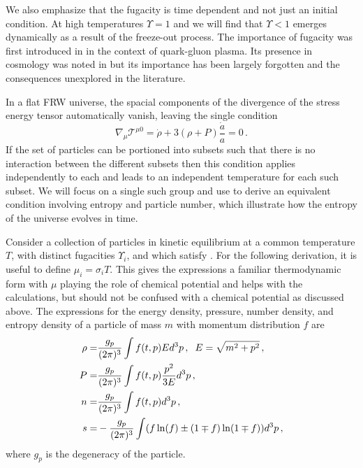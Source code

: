 We also emphasize that the fugacity is time dependent and not just an initial condition.  At high temperatures $\Upsilon=1$ and we will find that $\Upsilon<1$ emerges dynamically as a result of the freeze-out process. The importance of fugacity was first introduced in \cite{Rafelski:1982pu} in the context of quark-gluon plasma.  Its presence in cosmology was noted in  \cite{Bernstein:1985th,Dolgov:1992wf} but its importance has been largely forgotten and the consequences unexplored in the literature.  

In a flat FRW universe, the spacial components of the divergence of the stress energy tensor automatically vanish, leaving the single condition
\begin{equation}\label{stress_energy_eq}
\nabla_\mu \mathcal{T}^{\mu 0}=\dot{\rho}+3\left(\rho+P\right)\frac{\dot{a}}{a}=0\,.
\end{equation}
If the set of particles can be portioned into subsets such that there is no interaction between the different subsets then this condition applies independently to each and leads to an independent temperature for each such subset.  We will focus on a single such group and use   to derive an equivalent condition involving entropy and particle number, which illustrate how the entropy of the universe evolves in time. 

Consider a  collection of particles in kinetic equilibrium at a common temperature $T$, with distinct fugacities $\Upsilon_i$, and  which satisfy .   For the following derivation, it is useful to define $\mu_i=\sigma_i T$.  This gives the expressions a familiar thermodynamic form with $\mu$ playing the role of chemical potential and helps with the calculations, but should not be confused with a chemical potential as discussed above.  The expressions for the  energy density, pressure, number density, and entropy density of a particle of mass $m$ with momentum distribution $f$ are
\begin{align}\label{moments}
\rho=&\frac{g_p}{(2\pi)^3}\int f(t,p)Ed^3p\,, \hspace{2mm} E=\sqrt{m^2+p^2}\,,\\
P=&\frac{g_p}{(2\pi)^3}\int f(t,p)\frac{p^2}{3E}d^3p\,,\\
n=&\frac{g_p}{(2\pi)^3}\int f(t,p) d^3p\,,\\
s=&-\frac{g_p}{(2\pi)^3}\int (f\ln(f)\pm(1\mp f)\ln(1\mp f)) d^3p\,,
\end{align}
where $g_p$ is the degeneracy of the particle.

